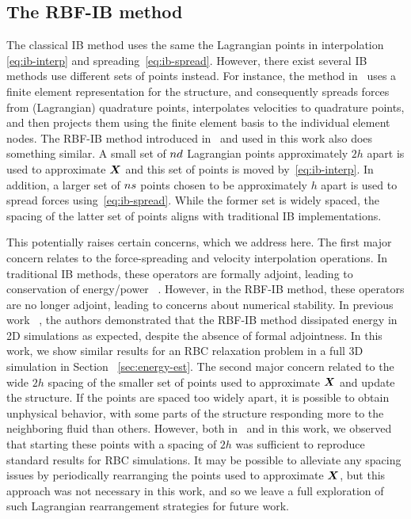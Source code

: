 \subsection{The RBF-IB method}\label{sec:rbfib}

The classical IB method uses the same the Lagrangian points in interpolation~%
\eqref{eq:ib-interp} and spreading~\eqref{eq:ib-spread}. However, there exist several IB
methods use different sets of points instead. For instance, the method in~%
\cite{Griffith:2017id} uses a finite element representation for the structure, and
consequently spreads forces from (Lagrangian) quadrature points, interpolates velocities
to quadrature points, and then projects them using the finite element basis to the
individual element nodes. The RBF-IB method introduced in~\cite{Shankar:2015km} and used
in this work also does something similar. A small set of $\data\cardinality$ Lagrangian
points approximately $2h$ apart is used to approximate $\boldsymbol{X}$ and this set of points is
moved by~\eqref{eq:ib-interp}. In addition, a larger set of $\sample\cardinality$ points
chosen to be approximately $h$ apart is used to spread forces using~\eqref{eq:ib-spread}.
While the former set is widely spaced, the spacing of the latter set of points aligns
with traditional IB implementations.

This potentially raises certain concerns, which we address here. The first major concern
relates to the force-spreading and velocity interpolation operations. In traditional IB
methods, these operators are formally adjoint, leading to conservation of energy/power~%
\cite{Peskin:2002go}. However, in the RBF-IB method, these operators are no longer
adjoint, leading to concerns about numerical stability. In previous work~%
\cite{Shankar:2015km}, the authors demonstrated that the RBF-IB method dissipated energy
in 2D simulations as expected, despite the absence of formal adjointness. In this work,
we show similar results for an RBC relaxation problem in a full 3D simulation in Section%
~\ref{sec:energy-est}. The second major concern related to the wide $2h$ spacing of the
smaller set of points used to approximate $\boldsymbol{X}$ and update the structure. If the points
are spaced too widely apart, it is possible to obtain unphysical behavior, with some
parts of the structure responding more to the neighboring fluid than others.  However,
both in~\cite{Shankar:2015km} and in this work, we observed that starting these points
with a spacing of $2h$ was sufficient to reproduce standard results for RBC simulations.
It may be possible to alleviate any spacing issues by periodically rearranging the points
used to approximate $\boldsymbol{X}$, but this approach was not necessary in this work, and so we
leave a full exploration of such Lagrangian rearrangement strategies for future work.
